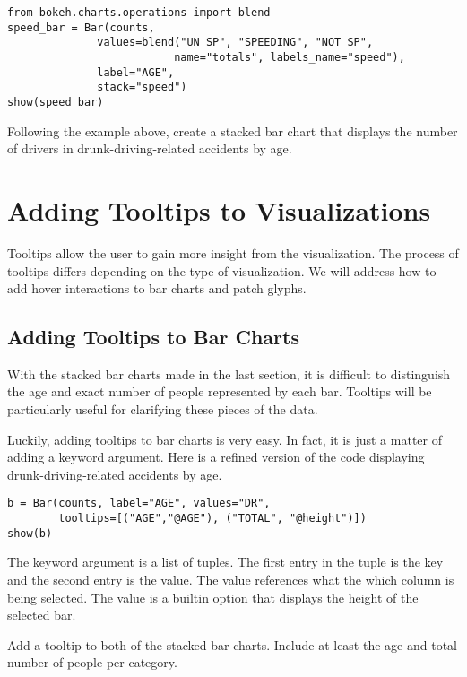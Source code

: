 \begin{lstlisting}
from bokeh.charts.operations import blend
speed_bar = Bar(counts,
              values=blend("UN_SP", "SPEEDING", "NOT_SP",
                          name="totals", labels_name="speed"),
              label="AGE",
              stack="speed")
show(speed_bar)
\end{lstlisting}

\begin{problem}
Following the example above, create a stacked bar chart that displays the
number of drivers in drunk-driving-related accidents by age.
\end{problem}

\section*{Adding Tooltips to Visualizations}
Tooltips allow the user to gain more insight from the visualization.
The process of tooltips differs depending on the type of visualization.
We will address how to add hover interactions to bar charts and patch glyphs.

\subsection*{Adding Tooltips to Bar Charts}
With the stacked bar charts made in the last section, it is difficult to
distinguish the age and exact number of people represented by each bar.
Tooltips will be  particularly useful for clarifying these pieces of the data.

Luckily, adding tooltips to bar charts is very easy. In fact, it is just a matter
of adding a keyword argument. Here is a refined version of the code displaying
drunk-driving-related accidents by age.

\begin{lstlisting}
b = Bar(counts, label="AGE", values="DR",
        tooltips=[("AGE","@AGE"), ("TOTAL", "@height")])
show(b)
\end{lstlisting}

The  keyword argument is a list of tuples. The first entry in the
tuple is the key and the second entry is the value. The value 
references what the which column is being selected. The value  is
a builtin option that displays the height of the selected bar.

\begin{problem}
Add a tooltip to both of the stacked bar charts. Include at least the age and
total number of people per category.
\end{problem}

